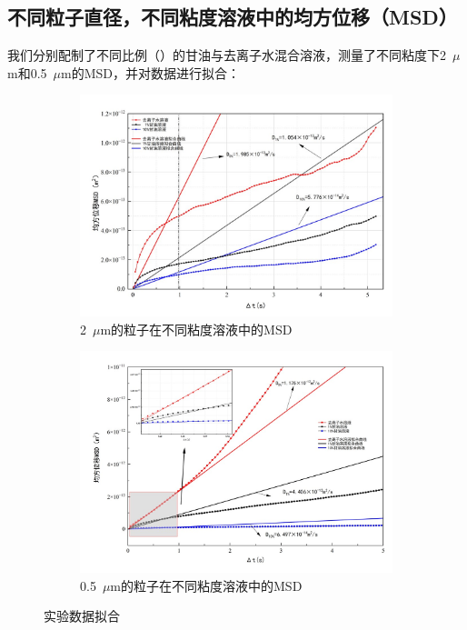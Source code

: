 \documentclass[a4paper]{report} %
\begin{document}
\subsection{不同粒子直径，不同粘度溶液中的均方位移（MSD）}
我们分别配制了不同比例（）的甘油与去离子水混合溶液，测量了不同粘度下2~$\mu$m和0.5~$\mu$m的MSD，并对数据进行拟合：\par
\begin{figure}[H]
    \centering
    \begin{subfigure}{0.45\textwidth}
        \includegraphics[width=\linewidth]{实验数据拟合2.jpg}
        \caption{2~$\mu$m的粒子在不同粘度溶液中的MSD}
        \label{fig:fit2}
    \end{subfigure}
    \begin{subfigure}{0.45\textwidth}
        \includegraphics[width=\linewidth]{实验数据拟合3.jpg}
        \caption{0.5~$\mu$m的粒子在不同粘度溶液中的MSD}
        \label{fig:fit3}
    \end{subfigure}

    \caption{实验数据拟合}
\end{figure}
\end{document}

